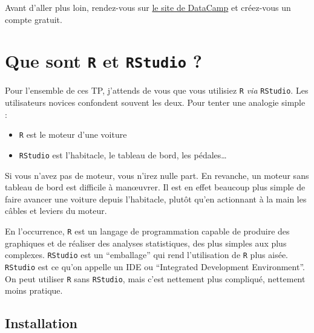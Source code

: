 \documentclass[
  a4paper,
  DIV=11,
  numbers=noendperiod,
  oneside]{scrreprt}
\providecommand{\tightlist}{%
  \setlength{\itemsep}{0pt}\setlength{\parskip}{0pt}}\usepackage{longtable,booktabs,array}
\begin{document}
\begin{tcolorbox}[enhanced jigsaw, arc=.35mm, opacityback=0, colbacktitle=quarto-callout-important-color!10!white, bottomrule=.15mm, coltitle=black, colframe=quarto-callout-important-color-frame, breakable, toprule=.15mm, title=\textcolor{quarto-callout-important-color}{\faExclamation}\hspace{0.5em}{Important}, leftrule=.75mm, titlerule=0mm, bottomtitle=1mm, toptitle=1mm, left=2mm, rightrule=.15mm, opacitybacktitle=0.6, colback=white]

Avant d'aller plus loin, rendez-vous sur
\href{https://www.datacamp.com/}{le site de DataCamp} et créez-vous un
compte gratuit.

\end{tcolorbox}

\section{\texorpdfstring{Que sont \texttt{R} et \texttt{RStudio}
?}{Que sont R et RStudio ?}}\label{que-sont-r-et-rstudio}

Pour l'ensemble de ces TP, j'attends de vous que vous utilisiez
\texttt{R} \emph{via} \texttt{RStudio}. Les utilisateurs novices
confondent souvent les deux. Pour tenter une analogie simple :

\begin{itemize}
\tightlist
\item
  \texttt{R} est le moteur d'une voiture
\item
  \texttt{RStudio} est l'habitacle, le tableau de bord, les
  pédales\ldots{}
\end{itemize}

Si vous n'avez pas de moteur, vous n'irez nulle part. En revanche, un
moteur sans tableau de bord est difficile à manœuvrer. Il est en effet
beaucoup plus simple de faire avancer une voiture depuis l'habitacle,
plutôt qu'en actionnant à la main les câbles et leviers du moteur.

En l'occurrence, \texttt{R} est un langage de programmation capable de
produire des graphiques et de réaliser des analyses statistiques, des
plus simples aux plus complexes. \texttt{RStudio} est un ``emballage''
qui rend l'utilisation de \texttt{R} plus aisée. \texttt{RStudio} est ce
qu'on appelle un IDE ou ``Integrated Development Environment''. On peut
utiliser \texttt{R} sans \texttt{RStudio}, mais c'est nettement plus
compliqué, nettement moins pratique.

\subsection{Installation}\label{sec-install}
\end{document}
